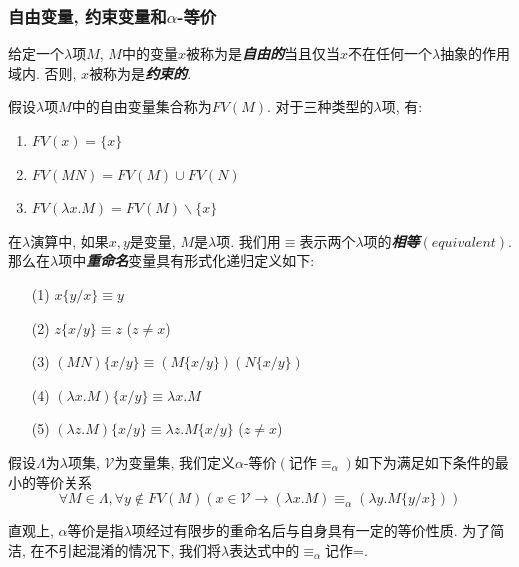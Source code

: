 \subsubsection{自由变量, 约束变量和\texorpdfstring{$\alpha$}{alpha}-等价}
\begin{definition}
    给定一个$\lambda$项$M$, $M$中的变量$x$被称为是\textbf{\textit{自由的}}当且仅当$x$不在任何一个$\lambda$抽象的作用域内. 否则, $x$被称为是\textbf{\textit{约束的}}.
\end{definition}
\noindent 假设$\lambda$项$M$中的自由变量集合称为$FV(M)$. 对于三种类型的$\lambda$项, 有:
\begin{enumerate}
    \item $FV(x)=\{x\}$
    \item $FV(MN)=FV(M)\cup FV(N)$
    \item $FV(\lambda x.M)=FV(M)\backslash\{x\}$
\end{enumerate}
\begin{definition}
    在$\lambda$演算中, 如果$x, y$是变量, $M$是$\lambda$项. 我们用$\equiv$表示两个$\lambda$项的\textbf{\textit{相等}}$\left(\right.equivalent\left.\right)$. 那么在$\lambda$项中\textbf{\textit{重命名}}变量具有形式化递归定义如下:
    \begin{enumerate}\normalfont{}
        \item[(1)] $x\{y/x\}\equiv y$
        \item[(2)] $z\{x/y\}\equiv z$ ($z\not=x$)
        \item[(3)] $(MN)\{x/y\}\equiv(M\{x/y\})(N\{x/y\})$
        \item[(4)] $(\lambda x.M)\{x/y\}\equiv\lambda x.M$
        \item[(5)] $(\lambda z.M)\{x/y\}\equiv\lambda z.M\{x/y\}$ ($z\not=x$)
    \end{enumerate}
\end{definition}
\begin{definition}
    假设$\Lambda$为$\lambda$项集, $\mathcal V$为变量集, 我们定义$\alpha$-等价$\left(\right.$记作$\equiv_\alpha$$\left.\right)$如下为满足如下条件的最小的等价关系
    \[
        \forall M\in \Lambda, \forall y\not\in FV(M)(x\in \mathcal V\to (\lambda x.M)\equiv_\alpha(\lambda y.M\{y/x\}))
    \]
\end{definition}
\noindent 直观上, $\alpha$等价是指$\lambda$项经过有限步的重命名后与自身具有一定的等价性质. 为了简洁, 在不引起混淆的情况下, 我们将$\lambda$表达式中的$\equiv_\alpha$记作=.


